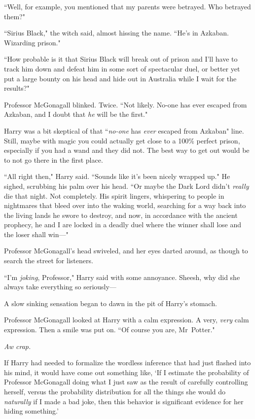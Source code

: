 ``Well, for example, you mentioned that my parents were betrayed. Who betrayed them?"

``Sirius Black," the witch said, almost hissing the name. ``He's in Azkaban. Wizarding prison."

``How probable is it that Sirius Black will break out of prison and I'll have to track him down and defeat him in some sort of spectacular duel, or better yet put a large bounty on his head and hide out in Australia while I wait for the results?"

Professor McGonagall blinked. Twice. ``Not likely. No-one has ever escaped from Azkaban, and I doubt that \emph{he} will be the first."

Harry was a bit skeptical of that ``\emph{no-one} has \emph{ever} escaped from Azkaban" line. Still, maybe with magic you could actually get close to a 100\% perfect prison, especially if you had a wand and they did not. The best way to get out would be to not go there in the first place.

``All right then," Harry said. ``Sounds like it's been nicely wrapped up." He sighed, scrubbing his palm over his head. ``Or maybe the Dark Lord didn't \emph{really} die that night. Not completely. His spirit lingers, whispering to people in nightmares that bleed over into the waking world, searching for a way back into the living lands he swore to destroy, and now, in accordance with the ancient prophecy, he and I are locked in a deadly duel where the winner shall lose and the loser shall win—"

Professor McGonagall's head swiveled, and her eyes darted around, as though to search the street for listeners.

``I'm \emph{joking}, Professor," Harry said with some annoyance. Sheesh, why did she always take everything so seriously—

A slow sinking sensation began to dawn in the pit of Harry's stomach.

Professor McGonagall looked at Harry with a calm expression. A very, \emph{very} calm expression. Then a smile was put on. ``Of course you are, Mr~Potter."

\emph{Aw crap.}

If Harry had needed to formalize the wordless inference that had just flashed into his mind, it would have come out something like, `If I estimate the probability of Professor McGonagall doing what I just saw as the result of carefully controlling herself, versus the probability distribution for all the things she would do \emph{naturally} if I made a bad joke, then this behavior is significant evidence for her hiding something.'

